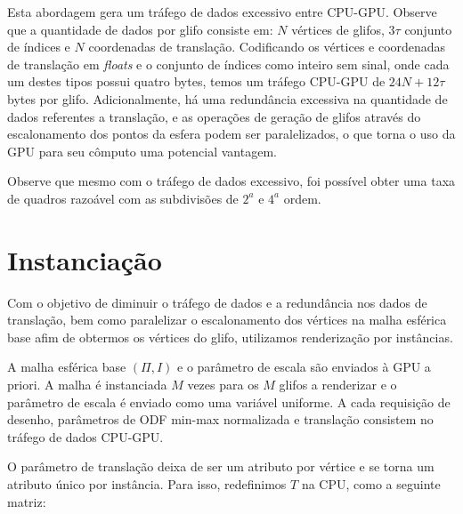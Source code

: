 \documentclass[
    12pt,                %
    oneside,            %
    a4paper,            %
    english,            %
    french,                %
    spanish,            %
    brazil                %
    ]{abntex2}
\begin{document}
Esta abordagem gera um tráfego de dados excessivo entre CPU-GPU. Observe que a quantidade de dados por glifo consiste em: $N$ vértices de glifos, $3\tau$ conjunto de índices e $N$ coordenadas de translação. Codificando os vértices e coordenadas de translação em \textit{floats} e o conjunto de índices como inteiro sem sinal, onde cada um destes tipos possui quatro bytes, temos um tráfego CPU-GPU de $24N + 12\tau$ bytes por glifo. Adicionalmente, há uma redundância excessiva na quantidade de dados referentes a translação, e as operações de geração de glifos através do escalonamento dos pontos da esfera podem ser paralelizados, o que torna o uso da GPU para seu cômputo uma potencial vantagem.

Observe que mesmo com o tráfego de dados excessivo, foi possível obter uma taxa de quadros razoável com as subdivisões de $2^a$ e $4^a$ ordem.



\section{Instanciação}
\label{sec::renderizacao_por_instancias}

Com o objetivo de diminuir o tráfego de dados e a redundância nos dados de translação, bem como paralelizar o escalonamento dos vértices na malha esférica base afim de obtermos os vértices do glifo, utilizamos renderização por instâncias.

A malha esférica base $(\Pi, I)$ e o parâmetro de escala são enviados à GPU a priori. A malha é instanciada $M$ vezes para os $M$ glifos a renderizar e o parâmetro de escala é enviado como uma variável uniforme. A cada requisição de desenho, parâmetros de ODF min-max normalizada e translação consistem no tráfego de dados CPU-GPU.

O parâmetro de translação deixa de ser um atributo por vértice e se torna um atributo único por instância. Para isso, redefinimos $T$ na CPU, como a seguinte matriz:
\end{document}
